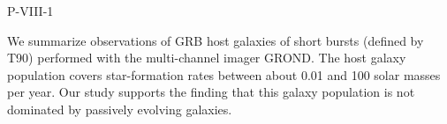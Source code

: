 P-VIII-1


\bigskip



\bigskip

\noindent We summarize observations of GRB host galaxies of short bursts (defined by T90) performed with the multi-channel imager GROND. The host galaxy population covers star-formation rates between about 0.01 and 100 solar masses per year. Our study supports the finding that this galaxy population is not dominated by passively evolving galaxies.

